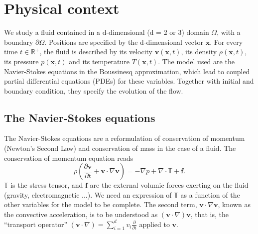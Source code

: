 \documentclass[12pt]{article}
\newcommand{\R}{\mathbb{R}}
\newcommand{\vb}[1]{\ensuremath{\boldsymbol #1}}
\begin{document}











\section{Physical context}
We study a fluid contained in a d-dimensional (d = 2 or 3) domain
$\Omega$, with a boundary $\partial \Omega$. Positions are specified
by the d-dimensional vector \vb{x}. For every time $t \in \R^+$, the
fluid is described by its velocity $\vb{v}(\vb{x}, t)$, its density
$\rho(\vb{x}, t)$, its pressure $p(\vb{x},t)$ and its temperature
$T(\vb{x}, t)$. The model used are the Navier-Stokes equations in the
Boussinesq approximation, which lead to coupled partial differential
equations (PDEs) for these variables. Together with initial and
boundary condition, they specify the evolution of the flow.
\subsection{The Navier-Stokes equations}
The Navier-Stokes equations are a reformulation of conservation of
momentum (Newton's Second Law) and conservation of mass in the case of
a fluid. The conservation of momentum equation reads
\begin{equation}
  \rho \left(\frac{\partial \vb{v}}{\partial t} + \vb{v} \cdot
    \nabla \vb{v}\right) = -\nabla p + \nabla \cdot\mathbb{T} +
  \vb{f}.
\end{equation}
$\mathbb{T}$ is the stress tensor, and \vb{f} are the external volumic
forces exerting on the fluid (gravity, electromagnetic ...).  We need
an expression of $\mathbb{T}$ as a function of the other variables for
the model to be complete. The second term, $\vb{v} \cdot \nabla
\vb{v}$, known as the convective acceleration, is to be understood
as $(\vb{v} \cdot \nabla) \vb{v}$, that is, the ``transport operator''
$(\vb{v} \cdot \nabla) = \sum_{i=1}^d v_i \frac{\partial}{\partial i}$
applied to $\vb{v}$.
\end{document}
